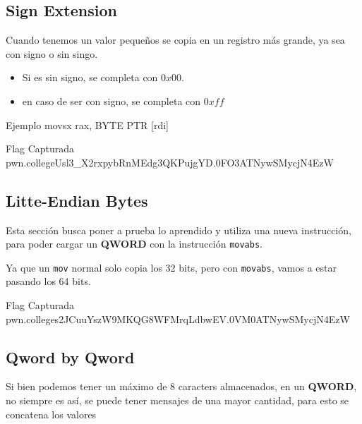 \subsection{Sign Extension}\label{subsec:sign_extension}

Cuando tenemos un valor pequeños se copia en un registro más grande, ya sea con signo o sin singo.

\begin{itemize}
	\item Si es sin signo, se completa con \( 0x00 \).
	\item en caso de ser con signo, se completa con \( 0xff \)
\end{itemize}

\begin{codebox}[ASM]{Ejemplo}
	movsx rax, BYTE PTR [rdi]
\end{codebox}

\begin{flagbox}{Flag Capturada}
	pwn.college{Usl3_X2rxpybRnMEdg3QKPujgYD.0FO3ATNywSMycjN4EzW}
\end{flagbox}

\subsection{Litte-Endian Bytes}\label{subsec:litte_endian_bytes}
Esta sección busca poner a prueba lo aprendido y utiliza una nueva instrucción, para poder cargar
un \textbf{QWORD} con la instrucción \texttt{movabs}.

Ya que un \texttt{mov} normal solo copia los 32 bits, pero con \texttt{movabs},
vamos a estar pasando los 64 bits.

\begin{flagbox}{Flag Capturada}
	pwn.college{s2JCuuYszW9MKQG8WFMrqLdbwEV.0VM0ATNywSMycjN4EzW}
\end{flagbox}
\subsection{Qword by Qword}\label{subsec:qword_by_qword}

Si bien podemos tener un máximo de 8 caracters almacenados, en un \textbf{QWORD},
no siempre es así, se puede tener mensajes de una mayor cantidad, para esto
se concatena los valores

